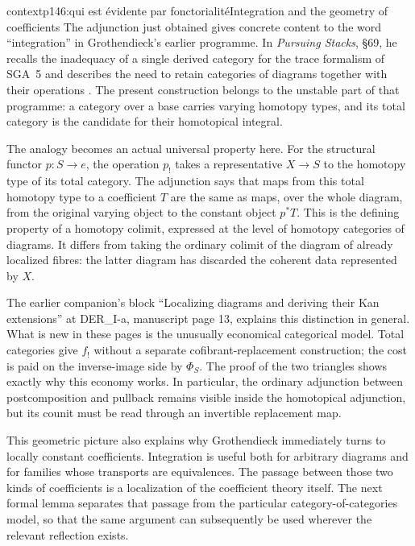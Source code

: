 \begin{dcomment}{context}{p146:qui est évidente par fonctorialité}{Integration and the geometry of coefficients}
The adjunction just obtained gives concrete content to the word ``integration'' in Grothendieck's earlier programme. In \emph{Pursuing Stacks}, \S69, he recalls the inadequacy of a single derived category for the trace formalism of SGA~5 and describes the need to retain categories of diagrams together with their operations \citep[\S69, pp.~1--3 of the separately edited text]{Grothendieck1983}. The present construction belongs to the unstable part of that programme: a category over a base carries varying homotopy types, and its total category is the candidate for their homotopical integral.

The analogy becomes an actual universal property here. For the structural functor $p:S\to e$, the operation $p_!$ takes a representative $X\to S$ to the homotopy type of its total category. The adjunction says that maps from this total homotopy type to a coefficient $T$ are the same as maps, over the whole diagram, from the original varying object to the constant object $p^*T$. This is the defining property of a homotopy colimit, expressed at the level of homotopy categories of diagrams. It differs from taking the ordinary colimit of the diagram of already localized fibres: the latter diagram has discarded the coherent data represented by $X$.

The earlier companion's block ``Localizing diagrams and deriving their Kan extensions'' at DER\_I-a, manuscript page 13, explains this distinction in general. What is new in these pages is the unusually economical categorical model. Total categories give $f_!$ without a separate cofibrant-replacement construction; the cost is paid on the inverse-image side by $\Phi_S$. The proof of the two triangles shows exactly why this economy works. In particular, the ordinary adjunction between postcomposition and pullback remains visible inside the homotopical adjunction, but its counit must be read through an invertible replacement map.

This geometric picture also explains why Grothendieck immediately turns to locally constant coefficients. Integration is useful both for arbitrary diagrams and for families whose transports are equivalences. The passage between those two kinds of coefficients is a localization of the coefficient theory itself. The next formal lemma separates that passage from the particular category-of-categories model, so that the same argument can subsequently be used wherever the relevant reflection exists.
\end{dcomment}

